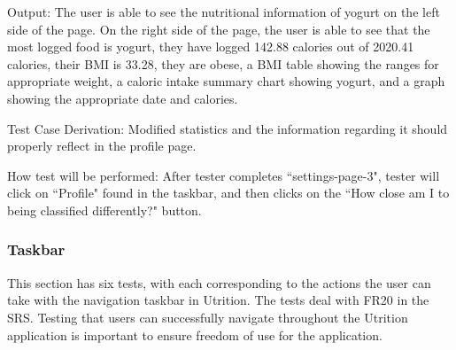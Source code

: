 \documentclass[12pt, titlepage]{article}
\begin{document}
\begin{enumerate}
		Output: The user is able to see the nutritional information of yogurt on the left side of the page. On the right side of the page, the user is able to see that the most logged food is yogurt, they have logged 142.88 calories out of 2020.41 calories, their BMI is 33.28, they are obese, a BMI table showing the ranges for appropriate weight, a caloric intake summary chart showing yogurt, and a graph showing the appropriate date and calories.
		
		Test Case Derivation: Modified statistics and the information regarding it should properly reflect in the profile page.
		
		How test will be performed: After tester completes ``settings-page-3", tester will click on ``Profile" found in the taskbar, and then clicks on the ``How close am I to being classified differently?" button.
		
	\end{enumerate}
	
	\subsubsection{Taskbar}
	This section has six tests, with each corresponding to the actions the user can take with the navigation taskbar in Utrition. The tests deal with FR20 in the SRS. Testing that users can successfully navigate throughout the Utrition application is important to ensure freedom of use for the application.
	
\end{document}
